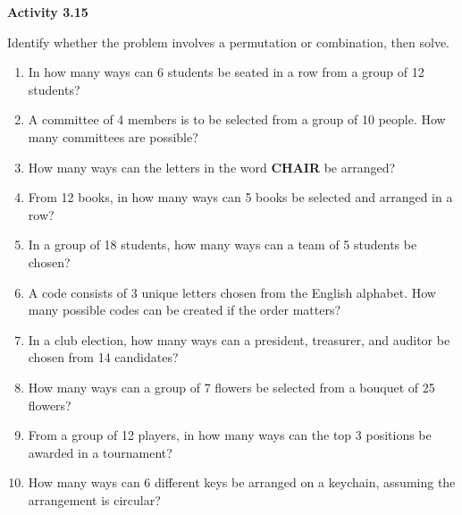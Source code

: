 \vspace{0.3ex}
\noindent\textbf{Activity 3.15}

\vspace{0.2ex}

Identify whether the problem involves a permutation or combination, then solve.

\begin{enumerate}[label=\color{blue}\arabic*.]
    \item In how many ways can 6 students be seated in a row from a group of 12 students?
    \item A committee of 4 members is to be selected from a group of 10 people. How many committees are possible?
    \item How many ways can the letters in the word \textbf{CHAIR} be arranged?
    \item From 12 books, in how many ways can 5 books be selected and arranged in a row?
    \item In a group of 18 students, how many ways can a team of 5 students be chosen?
    \item A code consists of 3 unique letters chosen from the English alphabet. How many possible codes can be created if the order matters?
    \item In a club election, how many ways can a president, treasurer, and auditor be chosen from 14 candidates?
    \item How many ways can a group of 7 flowers be selected from a bouquet of 25 flowers?
    \item From a group of 12 players, in how many ways can the top 3 positions be awarded in a tournament?
    \item How many ways can 6 different keys be arranged on a keychain, assuming the arrangement is circular?
\end{enumerate}
